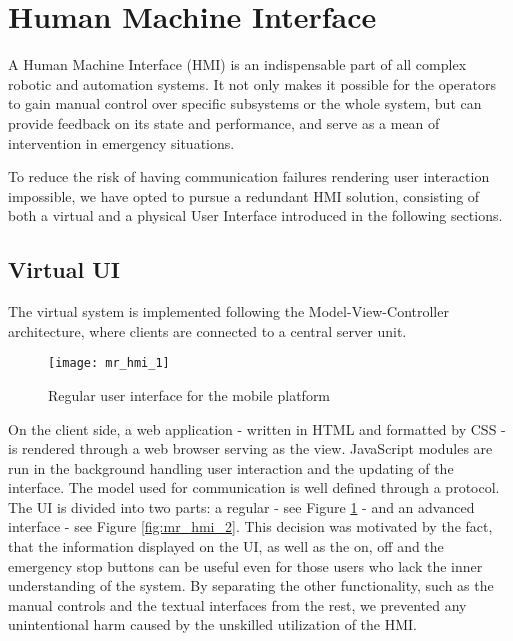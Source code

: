 \section{Human Machine Interface} %
\label{sec:mr_human_machine_interface}

A Human Machine Interface (HMI) is an indispensable part of all complex robotic and automation systems. It not only makes it possible for the operators to gain manual control over specific subsystems or the whole system, but can provide feedback on its state and performance, and serve as a mean of intervention in emergency situations.

To reduce the risk of having communication failures rendering user interaction impossible, we have opted to pursue a redundant HMI solution, consisting of both a virtual and a physical User Interface introduced in the following sections.

	\subsection{Virtual UI} %
	\label{sub:mr_web}
	
	The virtual system is implemented following the Model-View-Controller architecture, where clients are connected to a central server unit. 
	
	\begin{figure}[H]
		\centering
	    \texttt{[image: mr\_hmi\_1]}
	    \caption{Regular user interface for the mobile platform}
		\label{fig:mr_hmi_1}
	\end{figure}
	
	On the client side, a web application - written in HTML\cite{html} and formatted by CSS\cite{css} - is rendered through a web browser serving as the view. JavaScript\cite{javascript} modules are run in the background handling user interaction and the updating of the interface. The model used for communication is well defined through a protocol. The UI is divided into two parts: a regular - see Figure \ref{fig:mr_hmi_1} - and an advanced interface - see Figure \ref{fig:mr_hmi_2}. This decision was motivated by the fact, that the information displayed on the UI, as well as the on, off and the emergency stop buttons can be useful even for those users who lack the inner understanding of the system. By separating the other functionality, such as the manual controls and the textual interfaces from the rest, we prevented any unintentional harm caused by the unskilled utilization of the HMI.
	
